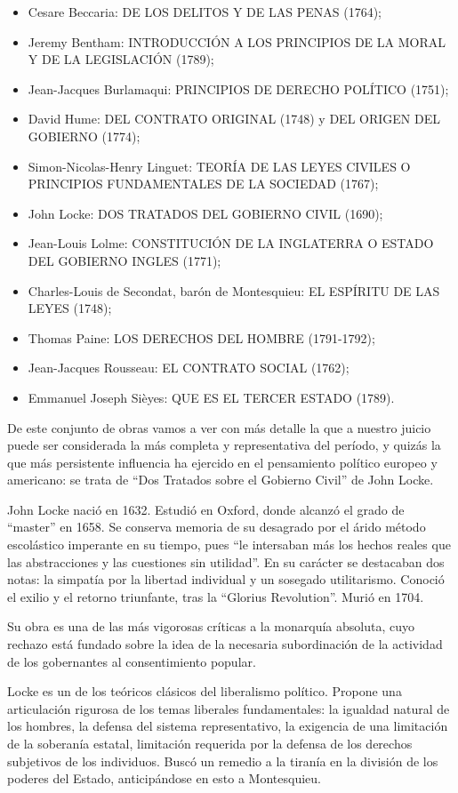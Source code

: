 \documentclass[
]{book}
\providecommand{\tightlist}{%
  \setlength{\itemsep}{0pt}\setlength{\parskip}{0pt}}
\begin{document}
\begin{itemize}
\tightlist
\item
  Cesare Beccaria: DE LOS DELITOS Y DE LAS PENAS (1764);
\item
  Jeremy Bentham: INTRODUCCIÓN A LOS PRINCIPIOS DE LA MORAL Y DE LA LEGISLACIÓN (1789);
\item
  Jean-Jacques Burlamaqui: PRINCIPIOS DE DERECHO POLÍTICO (1751);
\item
  David Hume: DEL CONTRATO ORIGINAL (1748) y DEL ORIGEN DEL GOBIERNO (1774);
\item
  Simon-Nicolas-Henry Linguet: TEORÍA DE LAS LEYES CIVILES O PRINCIPIOS FUNDAMENTALES DE LA SOCIEDAD (1767);
\item
  John Locke: DOS TRATADOS DEL GOBIERNO CIVIL (1690);
\item
  Jean-Louis Lolme: CONSTITUCIÓN DE LA INGLATERRA O ESTADO DEL GOBIERNO INGLES (1771);
\item
  Charles-Louis de Secondat, barón de Montesquieu: EL ESPÍRITU DE LAS LEYES (1748);
\item
  Thomas Paine: LOS DERECHOS DEL HOMBRE (1791-1792);
\item
  Jean-Jacques Rousseau: EL CONTRATO SOCIAL (1762);
\item
  Emmanuel Joseph Sièyes: QUE ES EL TERCER ESTADO (1789).
\end{itemize}

De este conjunto de obras vamos a ver con más detalle la que a nuestro juicio puede ser considerada la más completa y representativa del período, y quizás la que más persistente influencia ha ejercido en el pensamiento político europeo y americano: se trata de ``Dos Tratados sobre el Gobierno Civil'' de John Locke.

John Locke nació en 1632. Estudió en Oxford, donde alcanzó el grado de ``master'' en 1658. Se conserva memoria de su desagrado por el árido método escolástico imperante en su tiempo, pues ``le intersaban más los hechos reales que las abstracciones y las cuestiones sin utilidad''. En su carácter se destacaban dos notas: la simpatía por la libertad individual y un sosegado utilitarismo. Conoció el exilio y el retorno triunfante, tras la ``Glorius Revolution''. Murió en 1704.

Su obra es una de las más vigorosas críticas a la monarquía absoluta, cuyo rechazo está fundado sobre la idea de la necesaria subordinación de la actividad de los gobernantes al consentimiento popular.

Locke es un de los teóricos clásicos del liberalismo político. Propone una articulación rigurosa de los temas liberales fundamentales: la igualdad natural de los hombres, la defensa del sistema representativo, la exigencia de una limitación de la soberanía estatal, limitación requerida por la defensa de los derechos subjetivos de los individuos. Buscó un remedio a la tiranía en la división de los poderes del Estado, anticipándose en esto a Montesquieu.
\end{document}
